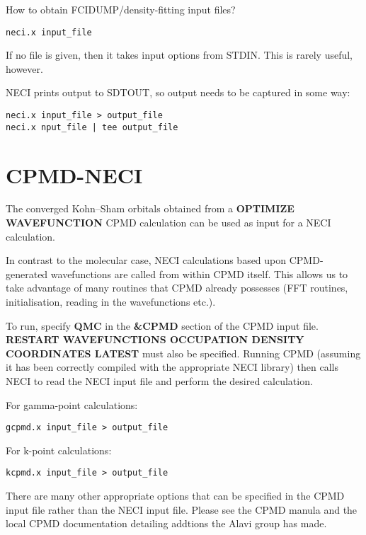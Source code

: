 \documentclass[openany,a4paper,10pt]{manual}
\begin{document}
\begin{notice}[note]
How to obtain FCIDUMP/density-fitting input files?
\end{notice}

\begin{Verbatim}[commandchars=@\[\]]
neci.x input_file
\end{Verbatim}

If no file is given, then it takes input options from STDIN.  This is rarely useful, however.

NECI prints output to SDTOUT, so output needs to be captured in some way:

\begin{Verbatim}[commandchars=@\[\]]
neci.x input_file > output_file
neci.x nput_file | tee output_file
\end{Verbatim}


\section{CPMD-NECI}

The converged Kohn--Sham orbitals obtained from a \textbf{OPTIMIZE
WAVEFUNCTION} CPMD calculation can be used as input for a NECI
calculation.

In contrast to the molecular case, NECI calculations based upon
CPMD-generated wavefunctions are called from within CPMD itself.
This allows us to take advantage of many routines that CPMD already
possesses (FFT routines, initialisation, reading in the wavefunctions
etc.).

To run, specify \textbf{QMC} in the \textbf{\&CPMD} section of the CPMD input file.
\textbf{RESTART WAVEFUNCTIONS OCCUPATION DENSITY COORDINATES LATEST} must
also be specified.  Running CPMD (assuming it has been correctly compiled
with the appropriate NECI library) then calls NECI to read the NECI
input file and perform the desired calculation.

For gamma-point calculations:

\begin{Verbatim}[commandchars=@\[\]]
gcpmd.x input_file > output_file
\end{Verbatim}

For k-point calculations:

\begin{Verbatim}[commandchars=@\[\]]
kcpmd.x input_file > output_file
\end{Verbatim}

There are many other appropriate options that can be specified in the
CPMD input file rather than the NECI input file.  Please see the CPMD
manula and the local CPMD documentation detailing addtions the Alavi
group has made.
\end{document}
